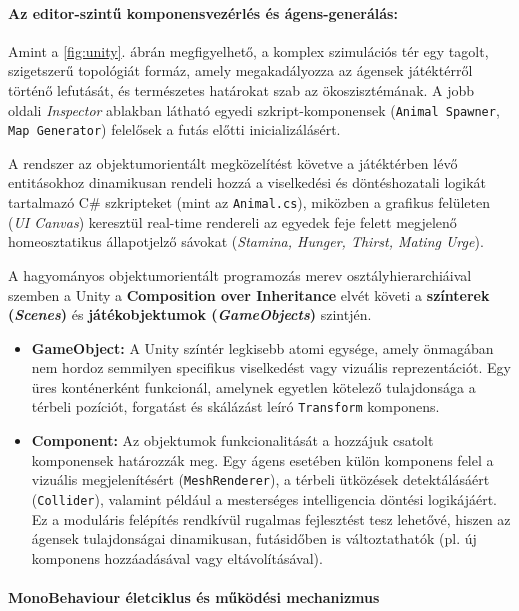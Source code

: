 \paragraph{Az editor-szintű komponensvezérlés és ágens-generálás:}
Amint a \ref{fig:unity}. ábrán megfigyelhető, a komplex szimulációs tér egy tagolt, szigetszerű topológiát formáz, amely megakadályozza az ágensek játéktérről történő lefutását, és természetes határokat szab az ökoszisztémának. A jobb oldali \textit{Inspector} ablakban látható egyedi szkript-komponensek (\texttt{Animal Spawner}, \texttt{Map Generator}) felelősek a futás előtti inicializálásért. 

A rendszer az objektumorientált megközelítést követve a játéktérben lévő entitásokhoz dinamikusan rendeli hozzá a viselkedési és döntéshozatali logikát tartalmazó C\# szkripteket (mint az \texttt{Animal.cs}), miközben a grafikus felületen (\textit{UI Canvas}) keresztül real-time rendereli az egyedek feje felett megjelenő homeosztatikus állapotjelző sávokat (\textit{Stamina, Hunger, Thirst, Mating Urge}).

A hagyományos objektumorientált programozás merev osztályhierarchiáival szemben a Unity a \textbf{Composition over Inheritance} elvét követi a \textbf{színterek (\textit{Scenes})} és \textbf{játékobjektumok (\textit{GameObjects})} szintjén. 

\begin{itemize}
    \item \textbf{GameObject:} A Unity színtér legkisebb atomi egysége, amely önmagában nem hordoz semmilyen specifikus viselkedést vagy vizuális reprezentációt. Egy üres konténerként funkcionál, amelynek egyetlen kötelező tulajdonsága a térbeli pozíciót, forgatást és skálázást leíró \texttt{Transform} komponens.
    \item \textbf{Component:} Az objektumok funkcionalitását a hozzájuk csatolt komponensek határozzák meg. Egy ágens esetében külön komponens felel a vizuális megjelenítésért (\texttt{MeshRenderer}), a térbeli ütközések detektálásáért (\texttt{Collider}), valamint például a mesterséges intelligencia döntési logikájáért. Ez a moduláris felépítés rendkívül rugalmas fejlesztést tesz lehetővé, hiszen az ágensek tulajdonságai dinamikusan, futásidőben is változtathatók (pl. új komponens hozzáadásával vagy eltávolításával).
\end{itemize}

\paragraph{MonoBehaviour életciklus és működési mechanizmus}~\\

